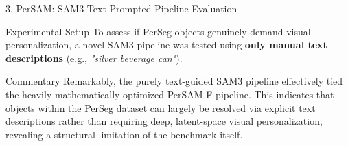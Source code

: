 \documentclass[aspectratio=169, 10pt]{beamer}
\begin{document}
\begin{frame}{3. PerSAM: SAM3 Text-Prompted Pipeline Evaluation}
    \begin{block}{Experimental Setup}
        To assess if PerSeg objects genuinely demand visual personalization, a novel SAM3\cite{carion2025sam3} pipeline was tested using \textbf{only manual text descriptions} (e.g., \textit{"silver beverage can"}).
    \end{block}

    \begin{table}[htbp]
    \centering
    \caption{Aggregated Comparison: SAM3 vs PerSAM Frameworks}
    \end{table}
    
    \begin{alertblock}{Commentary}
        \footnotesize Remarkably, the purely text-guided SAM3 pipeline effectively tied the heavily mathematically optimized PerSAM-F pipeline. This indicates that objects within the PerSeg dataset can largely be resolved via explicit text descriptions rather than requiring deep, latent-space visual personalization, revealing a structural limitation of the benchmark itself.
    \end{alertblock}
\end{frame}
\end{document}
